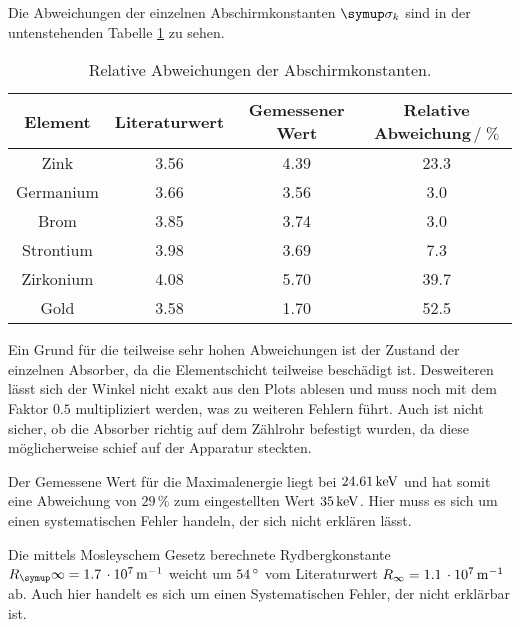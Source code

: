 
Die Abweichungen der einzelnen Abschirmkonstanten $\su{\sigma_k}$ sind in der
untenstehenden Tabelle \ref{tab:abw} zu sehen.
\begin{table}
  \centering
  \begin{tabular}{c c c c }
    \toprule
    Element & Literaturwert & Gemessener Wert & Relative Abweichung$\,/\;\%$ \\
    \midrule
    Zink       & 3.56 & 4.39 & 23.3 \\
    Germanium  & 3.66 & 3.56 &  3.0 \\
    Brom       & 3.85 & 3.74 &  3.0 \\
    Strontium  & 3.98 & 3.69 &  7.3 \\
    Zirkonium  & 4.08 & 5.70 & 39.7 \\
    Gold       & 3.58 & 1.70 & 52.5 \\
    \bottomrule
  \end{tabular}
  \caption{Relative Abweichungen der Abschirmkonstanten.}
  \label{tab:abw}
\end{table}
Ein Grund für die teilweise sehr hohen Abweichungen ist der Zustand der einzelnen
Absorber, da die Elementschicht teilweise beschädigt ist. Desweiteren lässt sich
der Winkel nicht exakt aus den Plots ablesen und muss noch mit dem Faktor $0.5$ multipliziert
werden, was zu weiteren Fehlern führt. Auch ist nicht
sicher, ob die Absorber richtig auf dem Zählrohr befestigt wurden, da diese möglicherweise
schief auf der Apparatur steckten.

Der Gemessene Wert für die Maximalenergie liegt bei $24.61\,\si{\kilo\electronvolt}$ und hat somit
eine Abweichung von $29\,\%$ zum eingestellten Wert $35\,\si{\kilo\electronvolt}$. Hier muss es sich
um einen systematischen Fehler handeln, der sich nicht erklären lässt.

Die mittels Mosleyschem Gesetz berechnete Rydbergkonstante $R_\su{\infty}=1.7\,
\cdot10^7\mt^{-1}$ weicht um $54\,\si{\degree}$ vom Literaturwert $R_\infty=1.1\,\cdot10^7
\,\si{\meter}^{-1}$\cite{Ryd} ab. Auch hier handelt es sich um einen Systematischen Fehler,
der nicht erklärbar ist.
